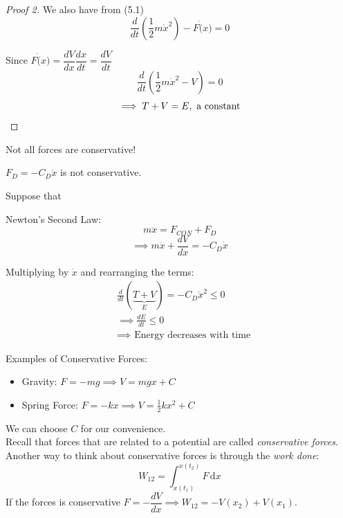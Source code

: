 \documentclass[twoside]{scrartcl}
\begin{document}
\begin{proof}[Proof 2] We also have from (5.1)
\[\frac{d}{dt}\left(\frac{1}{2}m\dot{x}^2\right) - F\dot(x) = 0\]

Since $F\dot(x) = \dfrac{dV}{dx}\dfrac{dx}{dt} = \dfrac{dV}{dt}$
\[\frac{d}{dt}\left(\frac{1}{2}m\dot{x}^2 - V\right) = 0
\]
\[\implies T + V = E, \text{ a constant}\qedhere\]
\end{proof}



Not all forces are conservative!\\

\begin{example}
$F_D = -C_D\dot{x}$	is not conservative. 

Suppose that 
\begin{center}
	
\end{center}

Newton's Second Law:
\[m\ddot{x} = F_{CON} + F_D\]
\[\implies m\ddot{x} + \frac{dV}{dx} = -C_D\dot{x}\]

Multiplying by $\dot{x}$ and rearranging the terms:
\[\begin{aligned}&\frac{d}{dt}(\underbrace{T + V}_{E}) = -C_D\dot{x}^2 \leq 0\\
&\implies \frac{dE}{dt} \leq 0 \\
&\implies \text{ Energy decreases with time}
\end{aligned}\]
\end{example}

Examples of Conservative Forces:
\begin{itemize}
\item Gravity: $F = -mg \implies V = mgx + C$	
\item Spring Force: $F = -kx \implies V = \frac{1}{2}kx^2 + C$
\end{itemize}
We can choose $C$ for our convenience.\\


Recall that forces that are related to a potential are called \emph{conservative forces}. Another way to think about conservative forces is through the \emph{work done}:
\[W_{12} = \int_{x(t_1)}^{x(t_2)}F\,\mathrm{d}x	\]
If the forces is conservative $F = -\dfrac{dV}{dx} \implies W_{12} = -V(x_2) + V(x_1)$. 
\end{document}
